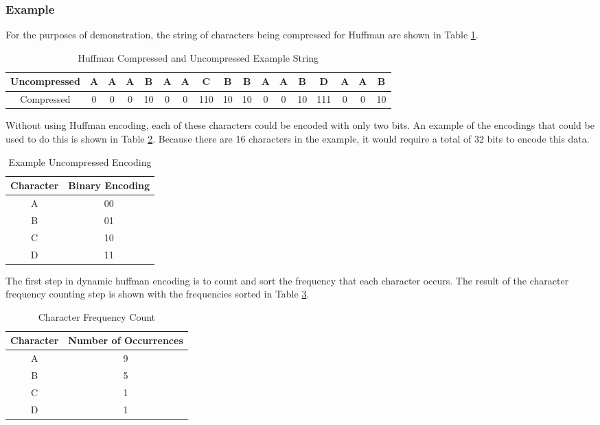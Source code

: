\documentclass[doublespace,nopageskip]{VTthesis}
\begin{document}
\subsubsection{Example}\label{sss:huffman_example}
For the purposes of demonstration, the string of characters being compressed for Huffman are shown in Table \ref{tab:huffman_encoding_example}.

\begin{table}[htb]
	\centering
	\caption{Huffman Compressed and Uncompressed Example String}
	\begin{tabular}{ccccccccccccccccc}
	    \toprule
	    Uncompressed & A & A & A & B & A & A & C & B & B & A & A & B & D & A & A & B\\
	    \midrule
	    Compressed & 0 & 0 & 0 & 10 & 0 & 0 & 110 & 10 & 10 & 0 & 0 & 10 & 111 & 0 & 0 & 10 \\
	    \bottomrule
	\end{tabular}
	\label{tab:huffman_encoding_example}
\end{table}

Without using Huffman encoding, each of these characters could be encoded with only two bits. An example of the encodings that could be used to do this is shown in Table \ref{tab:default_encoding}. Because there are 16 characters in the example, it would require a total of 32 bits to encode this data.

\begin{table}[htb]
	\centering
	\caption{Example Uncompressed Encoding}
	\begin{tabular}{cc}
	    \toprule
	    Character & Binary Encoding\\
	    \midrule
	    A & 00 \\
	    \midrule
	    B & 01 \\
	    \midrule
	    C & 10 \\
	    \midrule
	    D & 11 \\
	    \bottomrule
	\end{tabular}
	\label{tab:default_encoding}
\end{table}

The first step in dynamic huffman encoding is to count and sort the frequency that each character occurs. The result of the character frequency counting step is shown with the frequencies sorted in Table \ref{tab:character_frequency_count}.

\begin{table}[htb]
	\centering
	\caption{Character Frequency Count}
	\begin{tabular}{cc}
	    \toprule
	    Character & Number of Occurrences\\
	    \midrule
	    A & 9 \\
	    \midrule
	    B & 5 \\
	    \midrule
	    C & 1 \\
	    \midrule
	    D & 1 \\
	    \bottomrule
	\end{tabular}
	\label{tab:character_frequency_count}
\end{table}
\end{document}
